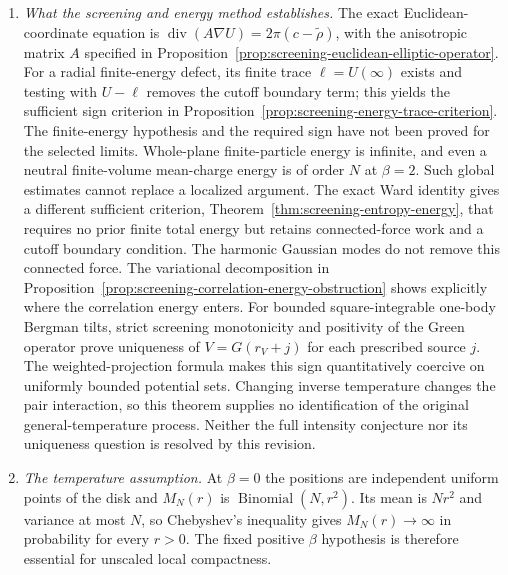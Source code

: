 \documentclass[11pt,a4paper]{article}
\numberwithin{equation}{section}
\theoremstyle{definition}
\theoremstyle{remark}
\begin{document}
\begin{enumerate}
has not been proved here.
Proposition~\ref{prop:boundary-covariance-nonuniqueness} also gives an
exact necessary and sufficient oscillation test for multiple original
gas subsequences, expressed in finite partition-integral ratios.
Its required nonzero oscillation has not been proved. Fixed boundary
regularizations are screened, but the boundary-uniform estimate needed
to control adjacent particle numbers remains unproved.
\item \emph{What the screening and energy method establishes.}
The exact Euclidean-coordinate equation is
$\operatorname{div}(A\nabla U)=2\pi(c-\widetilde\rho)$, with
the anisotropic matrix $A$ specified in
Proposition~\ref{prop:screening-euclidean-elliptic-operator}.
For a radial finite-energy defect, its finite trace $\ell=U(\infty)$
exists and testing with $U-\ell$ removes the cutoff boundary term;
this yields the sufficient sign criterion in
Proposition~\ref{prop:screening-energy-trace-criterion}.
The finite-energy hypothesis and the required sign have not been
proved for the selected limits. Whole-plane finite-particle energy
is infinite, and even a neutral finite-volume mean-charge energy is
of order $N$ at $\beta=2$. Such global estimates cannot replace a
localized argument.
The exact Ward identity gives a different sufficient criterion,
Theorem~\ref{thm:screening-entropy-energy}, that requires no prior
finite total energy but retains connected-force work and a cutoff
boundary condition. The harmonic Gaussian modes do not remove this
connected force. The variational decomposition in
Proposition~\ref{prop:screening-correlation-energy-obstruction}
shows explicitly where the correlation energy enters.
For bounded square-integrable one-body Bergman tilts, strict
screening monotonicity and positivity of the Green operator prove
uniqueness of $V=G(r_V+j)$ for each prescribed source $j$.
The weighted-projection formula makes this sign quantitatively
coercive on uniformly bounded potential sets. Changing inverse
temperature changes the pair interaction, so this theorem supplies
no identification of the original general-temperature process.
Neither the full intensity conjecture nor its uniqueness question
is resolved by this revision.
\item \emph{The temperature assumption.}
At $\beta=0$ the positions are independent uniform points of the disk
and $M_N(r)$ is $\operatorname{Binomial}(N,r^2)$. Its mean is $Nr^2$
and variance at most $N$, so Chebyshev's inequality gives
$M_N(r)\to\infty$ in probability for every $r>0$. The fixed positive
$\beta$ hypothesis is therefore essential for unscaled local compactness.
\end{enumerate}
\end{document}
